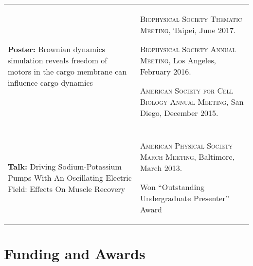 \documentclass[letterpaper,10pt]{article} %
\makeatletter
\newcommand\cellwidth{\TX@col@width}
\makeatother
\begin{document}
\begin{tabularx}{\textwidth}{p{} | X}
\begin{minipage}{.4\textwidth}
\textbf{Poster:} Brownian dynamics simulation reveals freedom of motors in the cargo membrane can influence cargo dynamics
\end{minipage}
&
\begin{minipage}{\cellwidth}
\begin{description}[itemsep=.25ex,labelsep=0em]
\item \textsc{Biophysical Society Thematic Meeting}, Taipei, June 2017.
\item \textsc{Biophysical Society Annual Meeting}, Los Angeles, February 2016.
\item \textsc{American Society for Cell Biology Annual Meeting}, San Diego, December 2015.
\end{description}
\end{minipage} \\

\multicolumn{2}{c}{} \\

\begin{minipage}{.4\textwidth}
\textbf{Talk:} Driving Sodium-Potassium Pumps With An Oscillating Electric Field: Effects On Muscle Recovery
\end{minipage}
&
\begin{minipage}{\cellwidth}
\begin{description}[itemsep=.25ex,labelsep=0em]
\item \textsc{American Physical Society March Meeting}, Baltimore, March 2013.
\item Won ``Outstanding Undergraduate Presenter'' Award
\end{description}
\end{minipage} 
\end{tabularx}


\section*{Funding and Awards}
\end{document}
